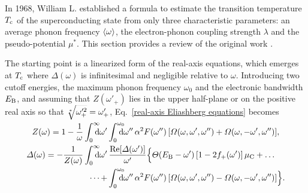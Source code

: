In 1968, William L.  established a formula to estimate the
transition temperature $T \sb{\text{c}}$ of the superconducting state from only three
characteristic parameters: an average phonon frequency $\langle\omega\rangle$, the
electron-phonon coupling strength $\lambda$ and the 
pseudo-potential $\mu^*$. This section provides a review of the original work
\cite{McMillan68}.

The starting point is a linearized form of the real-axis 
equations, which emerges at $T \sb{\text{c}}$ where $\Delta(\omega)$ is infinitesimal
and negligible relative to $\omega$. Introducing two cutoff energies, the
maximum phonon frequency $\omega_0$ and the electronic bandwidth $E \sb{\text{B}}$, and
assuming that $Z(\omega'_+)$ lies in the upper half-plane or on the positive
real axis so that $\smash{\sqrt[\ast]{\omega'^2_+}} = \omega'_+$,
Eq.~\ref{real-axis Eliashberg equations} becomes
%
\begin{align*}
    Z(\omega) = 1 - \frac 1 \omega
    \int \from 0 \till \infty \D \omega'
    &\int \from 0 \till{\omega_0} \D \omega'' \, \alpha^2 F(\omega'') \,
    [\Omega(\omega, \omega', \omega'') + \Omega(\omega, -\omega', \omega'')],
    \\
    \Delta(\omega) = -\frac 1 {Z(\omega)}
    \int \from 0 \till \infty \D \omega' \,
    \!&\,\frac{\Re[\Delta(\omega')]}{\omega'}
    \Big \{
        \Theta(E \sub B - \omega') \, [1 - 2 f_+(\omega')] \, \mu \sub C
        + \dots
        \\
        \dots +
        &\int \from 0 \till{\omega_0} \D \omega'' \, \alpha^2 F(\omega'') \,
        [\Omega(\omega, \omega', \omega'') - \Omega(\omega, -\omega', \omega'')]
    \Big \}.
\end{align*}

